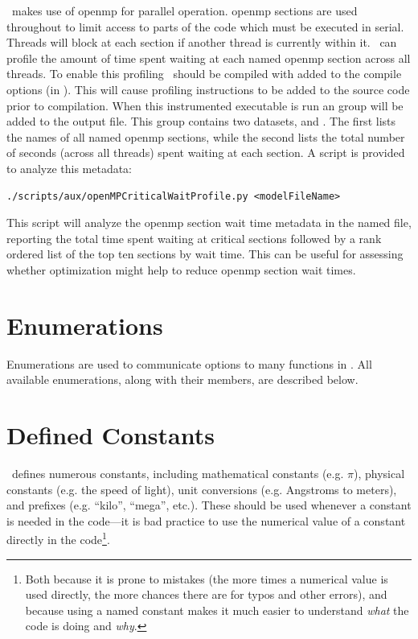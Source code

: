 \glc\ makes use of \gls{openmp} for parallel operation. \gls{openmp}  sections are used throughout to limit access to parts of the code which must be executed in serial. Threads will block at each  section if another thread is currently within it. \glc\ can profile the amount of time spent waiting at each named \gls{openmp}  section across all threads. To enable this profiling \glc\ should be compiled with  added to the compile options (in ). This will cause profiling instructions to be added to the source code prior to compilation. When this instrumented executable is run an  group will be added to the output file. This group contains two datasets,  and . The first lists the names of all named \gls{openmp}  sections, while the second lists the total number of seconds (across all threads) spent waiting at each section. A script is provided to analyze this metadata:
\begin{verbatim}
./scripts/aux/openMPCriticalWaitProfile.py <modelFileName>
\end{verbatim}
This script will analyze the \gls{openmp}  section wait time metadata in the named file, reporting the total time spent waiting at critical sections followed by a rank ordered list of the top ten sections by wait time. This can be useful for assessing whether optimization might help to reduce \gls{openmp}  section wait times.

\section{Enumerations}

Enumerations are used to communicate options to many functions in \glc. All available enumerations, along with their members, are described below.



\section{Defined Constants}

\glc\ defines numerous constants, including mathematical constants (e.g. $\pi$), physical constants (e.g. the speed of light), unit conversions (e.g. Angstroms to meters), and prefixes (e.g. ``kilo'', ``mega'', etc.). These should be used whenever a constant is needed in the code---it is bad practice to use the numerical value of a constant directly in the code\footnote{Both because it is prone to mistakes (the more times a numerical value is used directly, the more chances there are for typos and other errors), and because using a named constant makes it much easier to understand \emph{what} the code is doing and \emph{why}.}.


